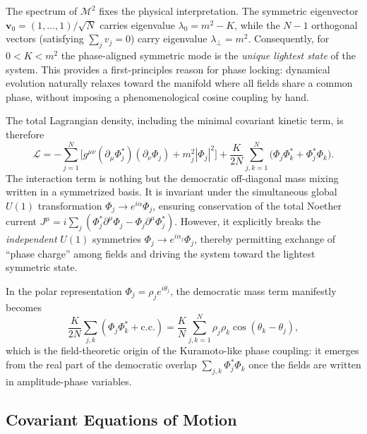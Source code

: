 The spectrum of $\mathcal{M}^2$ fixes the physical interpretation. The symmetric eigenvector $\mathbf{v}_0=(1,\dots,1)/\sqrt{N}$ carries eigenvalue $\lambda_0=m^2-K$, while the $N-1$ orthogonal vectors (satisfying $\sum_j v_j=0$) carry eigenvalue $\lambda_\perp=m^2$. Consequently, for $0<K<m^2$ the phase-aligned symmetric mode is the \emph{unique lightest state} of the system. This provides a first-principles reason for phase locking: dynamical evolution naturally relaxes toward the manifold where all fields share a common phase, without imposing a phenomenological cosine coupling by hand.

The total Lagrangian density, including the minimal covariant kinetic term, is therefore
\begin{equation}
\mathcal{L}
= -\sum_{j=1}^N \Big[ g^{\mu\nu}(\partial_\mu\Phi_j^*)(\partial_\nu\Phi_j) + m_j^2|\Phi_j|^2 \Big]
+ \frac{K}{2N}\sum_{j,k=1}^N \big(\Phi_j\Phi_k^* + \Phi_j^*\Phi_k\big) .
\end{equation}
The interaction term is nothing but the democratic off-diagonal mass mixing written in a symmetrized basis. It is invariant under the simultaneous global $U(1)$ transformation $\Phi_j\to e^{i\alpha}\Phi_j$, ensuring conservation of the total Noether current
$J^\mu = i\sum_j(\Phi_j^*\partial^\mu\Phi_j - \Phi_j\partial^\mu\Phi_j^*)$.
However, it explicitly breaks the \emph{independent} $U(1)$ symmetries $\Phi_j\to e^{i\alpha_j}\Phi_j$, thereby permitting exchange of ``phase charge'' among fields and driving the system toward the lightest symmetric state.

In the polar representation $\Phi_j=\rho_j e^{i\theta_j}$, the democratic mass term manifestly becomes
\begin{equation}
\frac{K}{2N}\sum_{j,k}(\Phi_j\Phi_k^*+\text{c.c.})
= \frac{K}{N}\sum_{j,k=1}^N \rho_j\rho_k\cos(\theta_k-\theta_j),
\end{equation}
which is the field-theoretic origin of the Kuramoto-like phase coupling: it emerges from the real part of the democratic overlap $\sum_{j,k}\Phi_j^*\Phi_k$ once the fields are written in amplitude-phase variables.

\subsection{Covariant Equations of Motion}
\label{subsec:eom}

